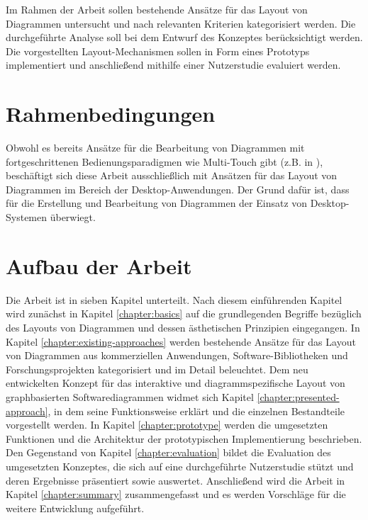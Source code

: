Im Rahmen der Arbeit sollen bestehende Ansätze für das Layout von Diagrammen untersucht und nach relevanten Kriterien kategorisiert werden. Die durchgeführte Analyse soll bei dem Entwurf des Konzeptes berücksichtigt werden. Die vorgestellten Layout-Mechanismen sollen in Form eines Prototyps implementiert und anschließend mithilfe einer Nutzerstudie evaluiert werden.

\section{Rahmenbedingungen}
\label{sec:thesis-conditions}

Obwohl es bereits Ansätze für die Bearbeitung von Diagrammen mit fortgeschrittenen Bedienungsparadigmen wie Multi-Touch gibt (z.B. in \cite{FrischHeydekorn10Diagram}), beschäftigt sich diese Arbeit ausschließlich mit Ansätzen für das Layout von Diagrammen im Bereich der Desktop-Anwendun\-gen. Der Grund dafür ist, dass für die Erstellung und Bearbeitung von Diagrammen der Einsatz von Desktop-Systemen überwiegt.

\section{Aufbau der Arbeit}

Die Arbeit ist in sieben Kapitel unterteilt. Nach diesem einführenden Kapitel wird zunächst in Kapitel \ref{chapter:basics} auf die grundlegenden Begriffe bezüglich des Layouts von Diagrammen und dessen ästhetischen Prinzipien eingegangen. In Kapitel \ref{chapter:existing-approaches} werden bestehende Ansätze für das Layout von Diagrammen aus kommerziellen Anwendungen, Software-Bibliotheken und Forschungsprojekten kategorisiert und im Detail beleuchtet. Dem neu entwickelten Konzept für das interaktive und diagrammspezifische Layout von graphbasierten Softwarediagrammen widmet sich Kapitel \ref{chapter:presented-approach}, in dem seine Funktionsweise erklärt und die einzelnen Bestandteile vorgestellt werden. In Kapitel \ref{chapter:prototype} werden die umgesetzten Funktionen und die Architektur der prototypischen Implementierung beschrieben. Den Gegenstand von Kapitel \ref{chapter:evaluation} bildet die Evaluation des umgesetzten Konzeptes, die sich auf eine durchgeführte Nutzerstudie stützt und deren Ergebnisse präsentiert sowie auswertet. Anschließend wird die Arbeit in Kapitel \ref{chapter:summary} zusammengefasst und es werden Vorschläge für die weitere Entwicklung aufgeführt.
